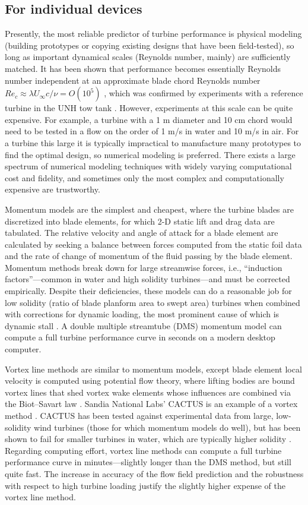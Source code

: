 \subsection{For individual devices}

Presently, the most reliable predictor of turbine performance is physical
modeling (building prototypes or copying existing designs that have been
field-tested), so long as important dynamical scales (Reynolds number, mainly)
are sufficiently matched. It has been shown that performance becomes essentially
Reynolds number independent at an approximate blade chord Reynolds number $Re_c
\approx \lambda U_\infty c / \nu = O(10^5)$ \cite{Bravo2007}, which was
confirmed by experiments with a reference turbine in the UNH tow tank
\cite{Bachant2014}. However, experiments at this scale can be quite expensive.
For example, a turbine with a 1 m diameter and 10 cm chord would need to be
tested in a flow on the order of 1 m/s in water and 10 m/s in air. For a turbine
this large it is typically impractical to manufacture many prototypes to find
the optimal design, so numerical modeling is preferred. There exists a large
spectrum of numerical modeling techniques with widely varying computational cost
and fidelity, and sometimes only the most complex and computationally expensive
are trustworthy.

Momentum models are the simplest and cheapest, where the turbine blades are
discretized into blade elements, for which 2-D static lift and drag data are
tabulated. The relative velocity and angle of attack for a blade element are
calculated by seeking a balance between forces computed from the static foil
data and the rate of change of momentum of the fluid passing by the blade
element. Momentum methods break down for large streamwise forces, i.e.,
``induction factors''---common in water and high solidity turbines---and must be
corrected empirically. Despite their deficiencies, these models can do a
reasonable job for low solidity (ratio of blade planform area to swept area)
turbines when combined with corrections for dynamic loading, the most prominent
cause of which is dynamic stall \cite{Para2002}. A double multiple streamtube
(DMS) momentum model can compute a full turbine performance curve in seconds on
a modern desktop computer.

Vortex line methods are similar to momentum models, except blade element local
velocity is computed using potential flow theory, where lifting bodies are bound
vortex lines that shed vortex wake elements whose influences are combined via
the Biot--Savart law \cite{Strickland1979}. Sandia National Labs' CACTUS is an
example of a vortex method \cite{Murray2011}. CACTUS has been tested against
experimental data from large, low-solidity wind turbines (those for which
momentum models do well), but has been shown to fail for smaller turbines in
water, which are typically higher solidity \cite{Michelen2014}. Regarding
computing effort, vortex line methods can compute a full turbine performance
curve in minutes---slightly longer than the DMS method, but still quite fast.
The increase in accuracy of the flow field prediction and the robustness with
respect to high turbine loading justify the slightly higher expense of the
vortex line method.


